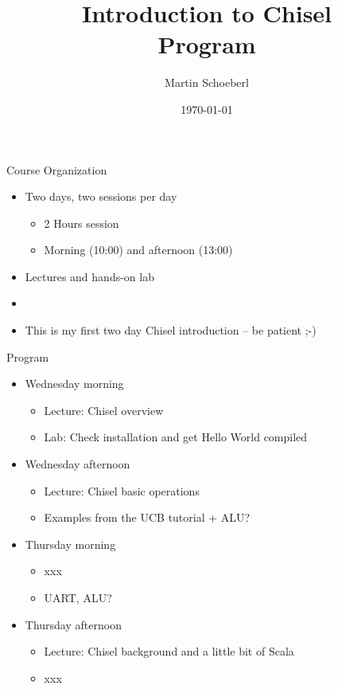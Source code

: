 \documentclass[xcolor=pdflatex,dvipsnames,table]{beamer}
\title{Introduction to Chisel\\Program}
\author{Martin Schoeberl}
\date{\today}
\institute{Technical University of Denmark}
\begin{document}
\begin{frame}
\titlepage
\end{frame}


\begin{frame}[fragile]{Course Organization}
\begin{itemize}
\item Two days, two sessions per day
\begin{itemize}
\item 2 Hours session
\item Morning (10:00) and afternoon (13:00)
\end{itemize}
\item Lectures and hands-on lab
\item 
\item This is my first two day Chisel introduction -- be patient ;-)
\end{itemize}
\end{frame}

\begin{frame}[fragile]{Program}
\begin{itemize}
\item Wednesday morning
\begin{itemize}
\item Lecture: Chisel overview
\item Lab: Check installation and get Hello World compiled
\end{itemize}
\item Wednesday afternoon
\begin{itemize}
\item Lecture: Chisel basic operations
\item Examples from the UCB tutorial + ALU?
\end{itemize}
\item Thursday morning
\begin{itemize}
\item xxx
\item UART, ALU?
\end{itemize}
\item Thursday afternoon
\begin{itemize}
\item Lecture: Chisel background and a little bit of Scala 
\item xxx
\end{itemize}
\end{itemize}
\end{frame}
\end{document}
